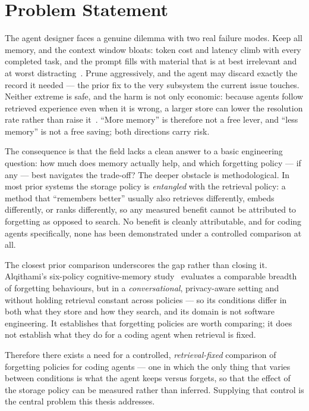 

\section{Problem Statement}

The agent designer faces a genuine dilemma with two real failure modes. Keep all memory,
and the context window bloats: token cost and latency climb with every completed task, and
the prompt fills with material that is at best irrelevant and at worst
distracting~\cite{liu2024,du2025}. Prune aggressively, and the agent may discard exactly
the record it needed --- the prior fix to the very subsystem the current issue touches.
Neither extreme is safe, and the harm is not only economic: because agents follow
retrieved experience even when it is wrong, a larger store can lower the resolution rate
rather than raise it~\cite{xiong2025}. ``More memory'' is therefore not a free lever, and
``less memory'' is not a free saving; both directions carry risk.

The consequence is that the field lacks a clean answer to a basic engineering question:
how much does memory actually help, and which forgetting policy --- if any --- best
navigates the trade-off? The deeper obstacle is methodological. In most prior systems the
storage policy is \emph{entangled} with the retrieval policy: a method that ``remembers
better'' usually also retrieves differently, embeds differently, or ranks differently, so
any measured benefit cannot be attributed to forgetting as opposed to search. No benefit
is cleanly attributable, and for coding agents specifically, none has been demonstrated
under a controlled comparison at all.

The closest prior comparison underscores the gap rather than closing it. Alqithami's
six-policy cognitive-memory study~\cite{alqithami2025} evaluates a comparable breadth of
forgetting behaviours, but in a \emph{conversational}, privacy-aware setting and without
holding retrieval constant across policies --- so its conditions differ in both what they
store and how they search, and its domain is not software engineering. It establishes that
forgetting policies are worth comparing; it does not establish what they do for a coding
agent when retrieval is fixed.

Therefore there exists a need for a controlled, \emph{retrieval-fixed} comparison of
forgetting policies for coding agents --- one in which the only thing that varies between
conditions is what the agent keeps versus forgets, so that the effect of the storage
policy can be measured rather than inferred. Supplying that control is the central problem
this thesis addresses.
